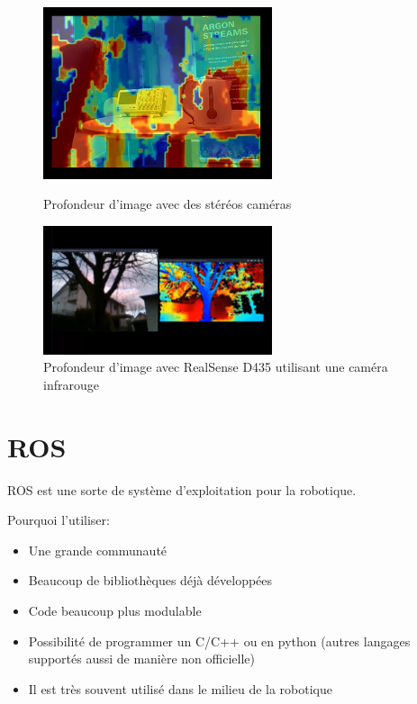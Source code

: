 \documentclass[a4paper, 11pt]{report}
\begin{document}
\begin{figure}[h!]
\begin{centering}
\includegraphics[width=0.6\textwidth]{images/depthMapStereo.jpg}
\caption{Profondeur d'image avec des stéréos caméras}
\includegraphics[width=0.6\textwidth]{images/depthMapRealSense.jpg}
\caption{Profondeur d'image avec RealSense D435 utilisant une caméra infrarouge}
\par\end{centering}
\end{figure}

\chapter{ROS}

ROS est une sorte de système d'exploitation pour la robotique.

Pourquoi l'utiliser:
\begin{itemize}
\item Une grande communauté
\item Beaucoup de bibliothèques déjà développées
\item Code beaucoup plus modulable
\item Possibilité de programmer un C/C++ ou en python (autres langages supportés aussi de manière non officielle)
\item Il est très souvent utilisé dans le milieu de la robotique
\end{itemize}
\end{document}
